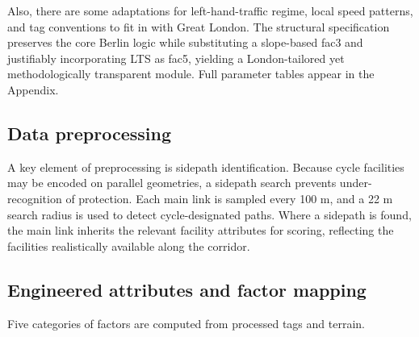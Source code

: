 \documentclass[
  12pt,
  oneside]{book}
\begin{document}
Also, there are some adaptations for left-hand-traffic regime, local speed patterns, and tag conventions to fit in with Great London.
The structural specification preserves the core Berlin logic while substituting a slope-based fac3 and justifiably incorporating LTS as fac5, yielding a London-tailored yet methodologically transparent module. Full parameter tables appear in the Appendix.

\subsection{Data preprocessing}\label{data-preprocessing}

A key element of preprocessing is sidepath identification. Because cycle facilities may be encoded on parallel geometries, a sidepath search prevents under-recognition of protection. Each main link is sampled every 100 m, and a 22 m search radius is used to detect cycle-designated paths. Where a sidepath is found, the main link inherits the relevant facility attributes for scoring, reflecting the facilities realistically available along the corridor.

\subsection{Engineered attributes and factor mapping}\label{engineered-attributes-and-factor-mapping}

Five categories of factors are computed from processed tags and terrain.
\end{document}
